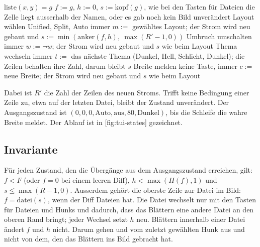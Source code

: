 \startxcell $\mathrm{liste}(x, y) = g$ \stopxcell
\startxcell $f := g$, $h := 0$, $s := \mathrm{kopf}(g)$, wie bei den Tasten für Dateien \stopxcell
\stopxrow
\startxrow
\startxcell \stopxcell
\startxcell \stopxcell
\startxcell die Zelle liegt ausserhalb der Namen, oder es gab noch kein Bild \stopxcell
\startxcell unverändert \stopxcell
\stopxrow
\startxrow
\startxcell Layout wählen \stopxcell
\startxcell {} Unified,  Split,  Auto \stopxcell
\startxcell immer \stopxcell
\startxcell $m := $ gewähltes Layout; der Strom wird neu gebaut und
$s := \min(\mathrm{anker}(f, h),\ \max(R' - 1, 0))$ \stopxcell
\stopxrow
\startxrow
\startxcell Umbruch umschalten \stopxcell
\startxcell {} \stopxcell
\startxcell immer \stopxcell
\startxcell $w := \neg w$; der Strom wird neu gebaut und $s$ wie beim Layout \stopxcell
\stopxrow
\startxrow
\startxcell Thema wechseln \stopxcell
\startxcell {} \stopxcell
\startxcell immer \stopxcell
\startxcell $t :=$ das nächste Thema (Dunkel, Hell, Schlicht, Dunkel); die Zeilen behalten ihre
Zahl, darum bleibt $s$ \stopxcell
\stopxrow
\startxrow[bottomframe=on]
\startxcell Breite melden \stopxcell
\startxcell keine Taste,  \stopxcell
\startxcell immer \stopxcell
\startxcell $c := $ neue Breite; der Strom wird neu gebaut und $s$ wie beim Layout \stopxcell
\stopxrow
\stopxtable
\stopplacetable

Dabei ist $R'$ die Zahl der Zeilen des neuen Stroms. Trifft keine Bedingung einer Zeile zu, etwa
 auf der letzten Datei, bleibt der Zustand unverändert. Der Ausgangszustand ist
$(0, 0, 0, \mathrm{Auto}, \mathrm{aus}, 80, \mathrm{Dunkel})$, bis die Schleife die wahre
Breite meldet.
Der Ablauf ist in [fig:tui-states] gezeichnet.

\startplacefigure[title={Zustände der Oberfläche von \type{diff --tui}},
    reference=fig:tui-states,location=here]
\stopplacefigure

\subsection{Invariante}

Für jeden Zustand, den die Übergänge aus dem Ausgangszustand erreichen, gilt: $f < F$
(oder $f = 0$ bei einem leeren Diff), $h < \max(H(f), 1)$ und $s \le \max(R - 1, 0)$.
Ausserdem gehört die oberste Zeile zur Datei im Bild: $f = \mathrm{datei}(s)$, wenn der Diff
Dateien hat. Die Datei wechselt nur mit den Tasten für Dateien und Hunks und dadurch, dass das
Blättern eine andere Datei an den oberen Rand bringt; jeder Wechsel setzt $h$ neu. Blättern
innerhalb einer Datei ändert $f$ und $h$ nicht. Darum gehen  und  vom zuletzt
gewählten Hunk aus und nicht von dem, den das Blättern ins Bild gebracht hat.

